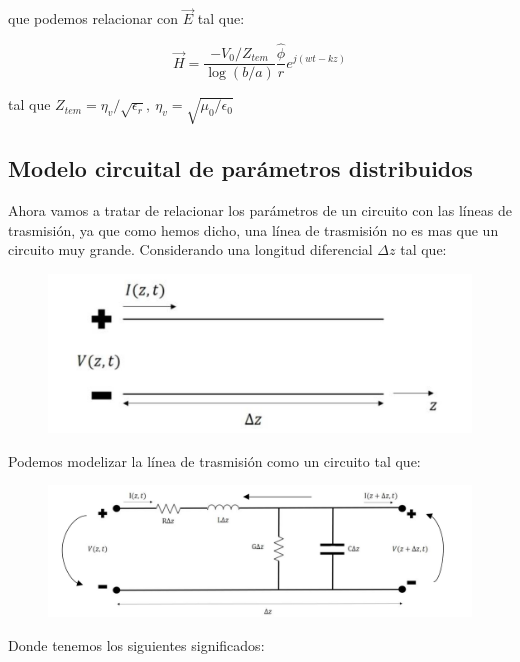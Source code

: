 \documentclass[12pt]{article}
\begin{document}
que podemos relacionar con $\vec{E}$ tal que:

\begin{equation}
\vec{H} = \dfrac{-V_0 / Z_{tem}}{\log ( b/a)} \dfrac{\hat{\phi}}{r} e^{j(wt-kz)}
\end{equation}

tal que $Z_{tem} = \eta_v / \sqrt{\epsilon_r}, \ \eta_v = \sqrt{\mu_0 / \epsilon_0}$



\subsection{Modelo circuital de parámetros distribuidos}

Ahora vamos a tratar de relacionar los parámetros de un circuito con las líneas de trasmisión, ya que como hemos dicho, una línea de trasmisión no es mas que un circuito muy grande. Considerando una longitud diferencial $\Delta z$ tal que:

\begin{figure}[h!] \centering
\includegraphics[scale=0.5]{lineatrasmision2.png}
\end{figure}


Podemos modelizar la línea de trasmisión como un circuito tal que:


\begin{figure}[h!] \centering
\includegraphics[scale=0.5]{lineatrasmision.png}
\end{figure}



Donde tenemos los siguientes significados:
\end{document}
